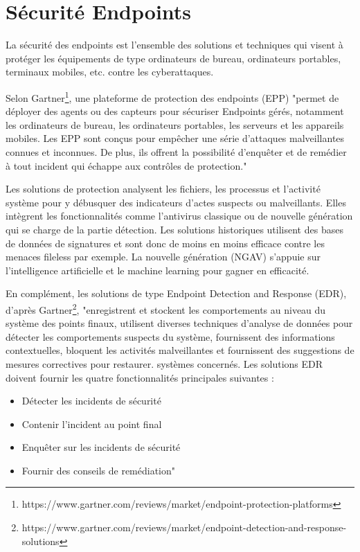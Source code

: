 \section{Sécurité Endpoints}

La sécurité des endpoints est l'ensemble des solutions et techniques qui visent à protéger les équipements de type ordinateurs de bureau, ordinateurs portables, terminaux mobiles, etc. contre les cyberattaques.

Selon Gartner\footnote{https://www.gartner.com/reviews/market/endpoint-protection-platforms}, une plateforme de protection des endpoints (EPP) "permet de déployer des agents ou des capteurs pour sécuriser Endpoints gérés, notamment les ordinateurs de bureau, les ordinateurs portables, les serveurs et les appareils mobiles. Les EPP sont conçus pour empêcher une série d’attaques malveillantes connues et inconnues. De plus, ils offrent la possibilité d'enquêter et de remédier à tout incident qui échappe aux contrôles de protection."

Les solutions de protection analysent les fichiers, les processus et l’activité système pour y débusquer des indicateurs d’actes suspects ou malveillants. Elles intègrent les fonctionnalités comme l'antivirus classique ou de nouvelle génération qui se charge de la partie détection. Les solutions historiques utilisent des bases de données de signatures et sont donc de moins en moins efficace contre les menaces fileless par exemple. La nouvelle génération (NGAV) s'appuie sur l'intelligence artificielle et le machine learning pour gagner en efficacité.

En complément, les solutions de type Endpoint Detection and Response (EDR), d'après Gartner\footnote{https://www.gartner.com/reviews/market/endpoint-detection-and-response-solutions}, "enregistrent et stockent les comportements au niveau du système des points finaux, utilisent diverses techniques d'analyse de données pour détecter les comportements suspects du système, fournissent des informations contextuelles, bloquent les activités malveillantes et fournissent des suggestions de mesures correctives pour restaurer. systèmes concernés. Les solutions EDR doivent fournir les quatre fonctionnalités principales suivantes : 
\begin{itemize}
    \item Détecter les incidents de sécurité
    \item Contenir l'incident au point final
    \item Enquêter sur les incidents de sécurité
    \item Fournir des conseils de remédiation"
\end{itemize}

